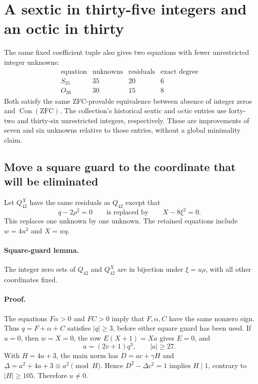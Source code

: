 \section{A sextic in thirty-five integers and an octic in thirty}
\label{sec:companions}

The same fixed coefficient tuple also gives two equations with fewer
unrestricted integer unknowns:
\[
 \begin{array}{c|r|r|r}
  \text{equation}&\text{unknowns}&\text{residuals}&\text{exact degree}\\\hline
  S_{35}&35&20&6\\
  O_{30}&30&15&8
 \end{array}
\]
Both satisfy the same ZFC-provable equivalence between absence of integer
zeros and $\operatorname{Con}(\mathrm{ZFC})$. The collection's historical
sextic and octic entries use forty-two and thirty-six unrestricted
integers, respectively. These are improvements of seven and six
unknowns relative to those entries, without a global minimality claim.

\subsection{Move a square guard to the coordinate that will be eliminated}

Let $Q_{42}^{X}$ have the same residuals as $Q_{42}$ except that
\[
 q-2\rho^2=0\qquad\text{is replaced by}\qquad X-8\xi^2=0.
\]
This replaces one unknown by one unknown. The retained equations include
$w=4u^2$ and $X=wq$.

\paragraph{Square-guard lemma.}
The integer zero sets of $Q_{42}$ and $Q_{42}^{X}$ are in bijection under
$\xi=u\rho$, with all other coordinates fixed.

\paragraph{Proof.}
The equations $F\alpha>0$ and $FC>0$ imply that $F,\alpha,C$ have the
same nonzero sign. Thus $q=F+\alpha+C$ satisfies $|q|\ge3$, before either
square guard has been used. If $u=0$, then $w=X=0$, the row
$E(X+1)=Xa$ gives $E=0$, and
\[
 a=(2v+1)q^3,\qquad |a|\ge27.
\]
With $H=4a+3$, the main norm has $D=ac+\gamma H$ and
$\Delta=a^2+4a+3\equiv a^2\pmod H$. Hence
$D^2-\Delta c^2=1$ implies $H\mid1$, contrary to $|H|\ge105$.
Therefore $u\ne0$.

